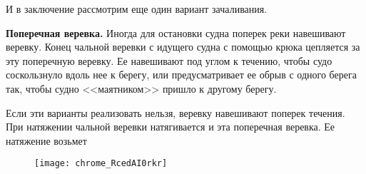 \documentclass[12pt,a4paper]{article}
\begin{document}
\begin{multicols}{2}
И в заключение рассмотрим еще один вариант зачаливания.

\textbf{Поперечная веревка.}
Иногда для остановки судна поперек реки навешивают веревку. Конец чальной веревки с идущего судна с помощью крюка цепляется за эту поперечную веревку.
Ее навешивают под углом к течению, чтобы судо соскользнуло вдоль нее к берегу, или предусматривает ее обрыв с одного берега так, чтобы судно <<маятником>> пришло к другому берегу.

Если эти варианты реализовать нельзя, веревку навешивают поперек течения. При натяжении чальной веревки натягивается и эта поперечная веревка. Ее натяжение возьмет
\begin{figure}[H]
    \centering
    \texttt{[image: chrome\_RcedAI0rkr]}
    \caption{}
    \end{figure}
\end{multicols}
\end{document}
